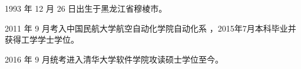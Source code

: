 \begin{resume}


  1993 年 12 月 26 日出生于黑龙江省穆棱市。

  2011 年 9 月考入中国民航大学航空自动化学院自动化系 ，2015年7月本科毕业并获得工学学士学位。

  2016 年 9 月统考进入清华大学软件学院攻读硕士学位至今。

%
%
%
%

\end{resume}
